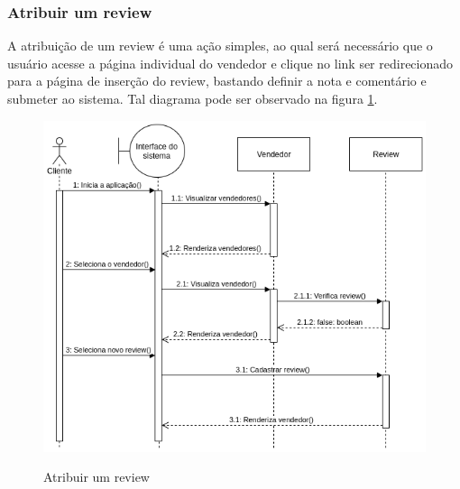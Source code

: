 \subsubsection{Atribuir um review}
A atribuição de um review é uma ação simples, ao qual será necessário que o usuário acesse a página individual do vendedor e clique no link ser redirecionado para a página de inserção do review, bastando definir a nota e comentário e submeter ao sistema. Tal diagrama pode ser observado na figura \ref{fig:sequence2}.
\begin{figure}[htbp!]
  \centering
  \caption{Atribuir um review}
  \includegraphics[width=1\textwidth]{figs/sequence2.png}
    \label{fig:sequence2}
\end{figure}


